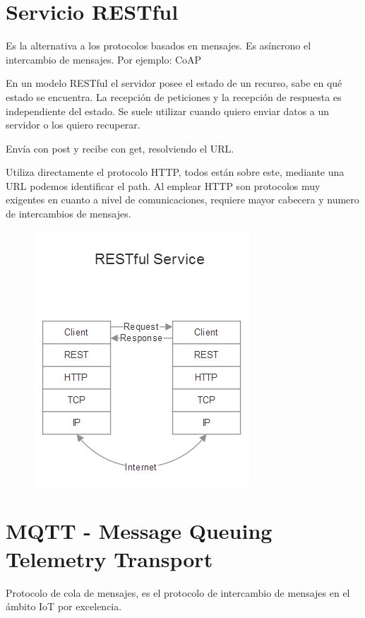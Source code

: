 \documentclass[12pt]{report} %
\begin{document}
\newpage

\section{Servicio RESTful}

Es la alternativa a los protocolos basados en mensajes. Es asíncrono el intercambio de mensajes. Por ejemplo: CoAP

En un modelo RESTful el servidor posee el estado de un recurso, sabe en qué estado se encuentra.
La recepción de peticiones y la recepción de respuesta es independiente del estado. Se suele utilizar cuando quiero enviar datos a un servidor o los quiero recuperar.

Envía con post y recibe con get, resolviendo el URL.

Utiliza directamente el protocolo HTTP, todos están sobre este, mediante una URL podemos identificar el path.
Al emplear HTTP son protocolos muy exigentes en cuanto a nivel de comunicaciones, requiere mayor cabecera y numero de intercambios de mensajes.

\begin{figure}[H]
	{\includegraphics[scale=.7]{2021-04-08 09_36_12-2021-04-07 17-01-12.mkv.png}}
\end{figure}

\section{MQTT - Message Queuing Telemetry Transport}
Protocolo de cola de mensajes, es el protocolo de intercambio de mensajes en el ámbito IoT por excelencia.
\end{document}
